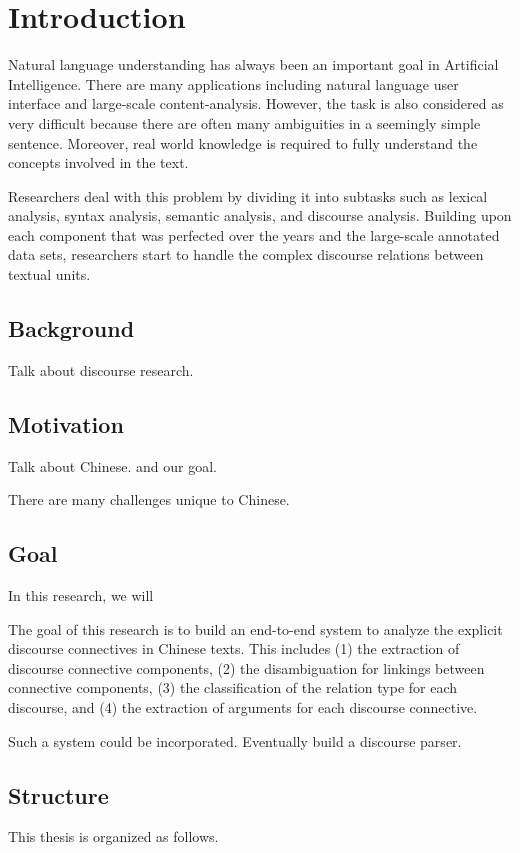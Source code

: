 %
%
%
\chapter{Introduction}
\label{c:intro}

Natural language understanding has always been an important goal in Artificial
Intelligence. There are many applications including natural language user
interface and large-scale content-analysis. However, the task is also considered
as very difficult because there are often many ambiguities in a seemingly
simple sentence. Moreover, real world knowledge is required to fully understand
the concepts involved in the text.

Researchers deal with this problem by dividing it into subtasks such as lexical
analysis, syntax analysis, semantic analysis, and discourse analysis. Building
upon each component that was perfected over the years and the large-scale
annotated data sets, researchers start to handle the complex discourse relations
between textual units.

%
%
\section{Background}

Talk about discourse research.




%
%
\section{Motivation}

Talk about Chinese. and our goal.

There are many challenges unique to Chinese.


%
%
\section{Goal}

In this research, we will 

The goal of this research is to build an end-to-end system to analyze the explicit discourse
connectives in Chinese texts. This includes (1) the extraction of discourse connective
components, (2) the disambiguation for linkings between connective components, (3) the classification
of the relation type for each discourse, and (4) the extraction of arguments for each discourse connective.

Such a system could be incorporated. Eventually build a discourse parser.

%
%
\section{Structure}
This thesis is organized as follows.
